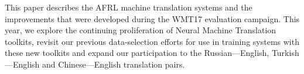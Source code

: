 This paper describes the AFRL machine translation systems and the improvements that were developed during the WMT17 evaluation campaign. This year, we explore the continuing proliferation of Neural Machine Translation toolkits, revisit our previous data-selection efforts for use in training systems with these new toolkits and expand our participation to the Russian---English, Turkish---English and Chinese---English translation pairs.
